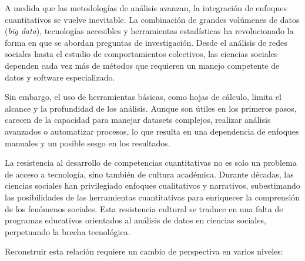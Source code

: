 \documentclass[
  letterpaper,
  DIV=11,
  numbers=noendperiod]{scrreprt}
\begin{document}
A medida que las metodologías de análisis avanzan, la integración de
enfoques cuantitativos se vuelve inevitable. La combinación de grandes
volúmenes de datos (\emph{big data}), tecnologías accesibles y
herramientas estadísticas ha revolucionado la forma en que se abordan
preguntas de investigación. Desde el análisis de redes sociales hasta el
estudio de comportamientos colectivos, las ciencias sociales dependen
cada vez más de métodos que requieren un manejo competente de datos y
software especializado.

Sin embargo, el uso de herramientas básicas, como hojas de cálculo,
limita el alcance y la profundidad de los análisis. Aunque son útiles en
los primeros pasos, carecen de la capacidad para manejar datasets
complejos, realizar análisis avanzados o automatizar procesos, lo que
resulta en una dependencia de enfoques manuales y un posible sesgo en
los resultados.

La resistencia al desarrollo de competencias cuantitativas no es solo un
problema de acceso a tecnología, sino también de cultura académica.
Durante décadas, las ciencias sociales han privilegiado enfoques
cualitativos y narrativos, subestimando las posibilidades de las
herramientas cuantitativas para enriquecer la comprensión de los
fenómenos sociales. Esta resistencia cultural se traduce en una falta de
programas educativos orientados al análisis de datos en ciencias
sociales, perpetuando la brecha tecnológica.

Reconstruir esta relación requiere un cambio de perspectiva en varios
niveles:
\end{document}

